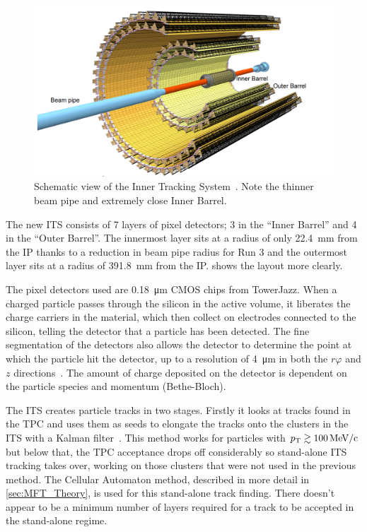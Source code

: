 \begin{figure}[h]
    \begin{center}
        \includegraphics[width=.8\textwidth]{Figs/ITS_Schematic.png}
        \caption{Schematic view of the Inner Tracking System~\cite{ITS_Upgrade_TDR}. Note the thinner beam pipe and extremely close Inner Barrel.}
        \label{fig:ITS_Schematic}
    \end{center}
\end{figure}

The new ITS consists of 7 layers of pixel detectors; 3 in the ``Inner Barrel'' and 4 in the ``Outer Barrel''. The innermost layer sits at a radius of only \SI{22.4}{\milli\metre} from the IP thanks to a reduction in beam pipe radius for Run 3 and the outermost layer sits at a radius of \SI{391.8}{\milli\metre} from the IP.  shows the layout more clearly. 

The pixel detectors used are \SI{0.18}{\micro\metre} CMOS chips from TowerJazz. When a charged particle passes through the silicon in the active volume, it liberates the charge carriers in the material, which then collect on electrodes connected to the silicon, telling the detector that a particle has been detected. The fine segmentation of the detectors also allows the detector to determine the point at which the particle hit the detector, up to a resolution of \SI{4}{\micro\metre} in both the $r\varphi$ and $z$ directions~\cite{ITS_Upgrade_TDR}. The amount of charge deposited on the detector is dependent on the particle species and momentum (Bethe-Bloch). 

The ITS creates particle tracks in two stages. Firstly it looks at tracks found in the TPC and uses them as seeds to elongate the tracks onto the clusters in the ITS with a Kalman filter~\cite{Kalman}. This method works for particles with $p_\mathrm{T}\gtrsim\SI{100}{\mega\electronvolt\per c}$ but below that, the TPC acceptance drops off considerably so stand-alone ITS tracking takes over, working on those clusters that were not used in the previous method. The Cellular Automaton method, described in more detail in \cref{sec:MFT_Theory}, is used for this stand-alone track finding. There doesn't appear to be a minimum number of layers required for a track to be accepted in the stand-alone regime. 

